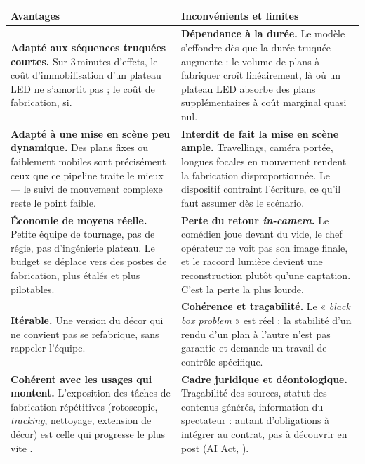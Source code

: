 \documentclass[11pt,a4paper]{report}
\begin{document}
\begin{center}
\small
\begin{tabularx}{\textwidth}{Y Y}
\toprule
{}\textbf{Avantages} & \textbf{Inconvénients et limites} \\
\midrule
\textbf{Adapté aux séquences truquées courtes.} Sur 3\,minutes d'effets, le coût d'immobilisation d'un plateau LED ne s'amortit pas ; le coût de fabrication, si. & \textbf{Dépendance à la durée.} Le modèle s'effondre dès que la durée truquée augmente : le volume de plans à fabriquer croît linéairement, là où un plateau LED absorbe des plans supplémentaires à coût marginal quasi nul. \\
\textbf{Adapté à une mise en scène peu dynamique.} Des plans fixes ou faiblement mobiles sont précisément ceux que ce pipeline traite le mieux --- le suivi de mouvement complexe reste le point faible. & \textbf{Interdit de fait la mise en scène ample.} Travellings, caméra portée, longues focales en mouvement rendent la fabrication disproportionnée. Le dispositif contraint l'écriture, ce qu'il faut assumer dès le scénario. \\
\textbf{Économie de moyens réelle.} Petite équipe de tournage, pas de régie, pas d'ingénierie plateau. Le budget se déplace vers des postes de fabrication, plus étalés et plus pilotables. & \textbf{Perte du retour \emph{in-camera}.} Le comédien joue devant du vide, le chef opérateur ne voit pas son image finale, et le raccord lumière devient une reconstruction plutôt qu'une captation. C'est la perte la plus lourde. \\
\textbf{Itérable.} Une version du décor qui ne convient pas se refabrique, sans rappeler l'équipe. & \textbf{Cohérence et traçabilité.} Le « \emph{black box problem} » est réel \autocite{lucidlink2026} : la stabilité d'un rendu d'un plan à l'autre n'est pas garantie et demande un travail de contrôle spécifique. \\
\textbf{Cohérent avec les usages qui montent.} L'exposition des tâches de fabrication répétitives (rotoscopie, \emph{tracking}, nettoyage, extension de décor) est celle qui progresse le plus vite \autocite{ktt_techniciens2026}. & \textbf{Cadre juridique et déontologique.} Traçabilité des sources, statut des contenus générés, information du spectateur : autant d'obligations à intégrer au contrat, pas à découvrir en post (AI Act, \autocite{aiact2024}). \\
\bottomrule
\end{tabularx}
\end{center}
\end{document}
